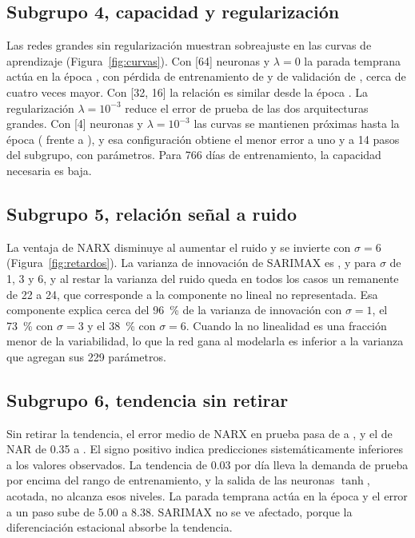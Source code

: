\documentclass[11pt,letterpaper]{article}
\begin{document}
\subsection{Subgrupo 4, capacidad y regularización}

Las redes grandes sin regularización muestran sobreajuste en las curvas de aprendizaje (Figura~\ref{fig:curvas}). Con [64] neuronas y $\lambda=0$ la parada temprana actúa en la época \epSesentaCero, con pérdida de entrenamiento de \trSesentaCero{} y de validación de \vaSesentaCero, cerca de cuatro veces mayor. Con [32, 16] la relación es similar desde la época \epDosCapasCero. La regularización $\lambda=10^{-3}$ reduce el error de prueba de las dos arquitecturas grandes. Con [4] neuronas y $\lambda=10^{-3}$ las curvas se mantienen próximas hasta la época \epCuatroL{} (\trCuatroL{} frente a \vaCuatroL), y esa configuración obtiene el menor error a uno y a 14 pasos del subgrupo, con \parCuatroL{} parámetros. Para 766 días de entrenamiento, la capacidad necesaria es baja.

\subsection{Subgrupo 5, relación señal a ruido}

La ventaja de NARX disminuye al aumentar el ruido y se invierte con $\sigma=6$ (Figura~\ref{fig:retardos}). La varianza de innovación de SARIMAX es \sigUno, \sigBase{} y \sigSeis{} para $\sigma$ de 1, 3 y 6, y al restar la varianza del ruido queda en todos los casos un remanente de 22 a 24, que corresponde a la componente no lineal no representada. Esa componente explica cerca del 96~\% de la varianza de innovación con $\sigma=1$, el 73~\% con $\sigma=3$ y el 38~\% con $\sigma=6$. Cuando la no linealidad es una fracción menor de la variabilidad, lo que la red gana al modelarla es inferior a la varianza que agregan sus 229 parámetros.

\subsection{Subgrupo 6, tendencia sin retirar}

Sin retirar la tendencia, el error medio de NARX en prueba pasa de \sesgoBase{} a \sesgoSin, y el de NAR de 0.35 a \sesgoNarSin. El signo positivo indica predicciones sistemáticamente inferiores a los valores observados. La tendencia de 0.03 por día lleva la demanda de prueba por encima del rango de entrenamiento, y la salida de las neuronas $\tanh$, acotada, no alcanza esos niveles. La parada temprana actúa en la época \epSin{} y el error a un paso sube de 5.00 a 8.38. SARIMAX no se ve afectado, porque la diferenciación estacional absorbe la tendencia.
\end{document}
